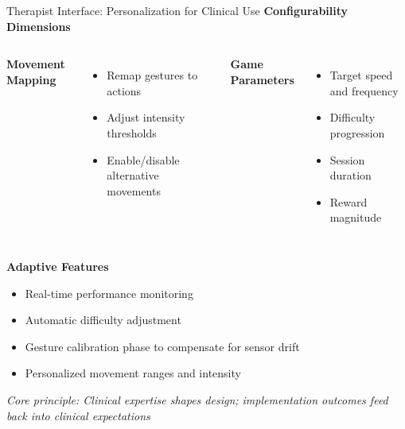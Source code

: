 \begin{frame}{Therapist Interface: Personalization for Clinical Use}
	\textbf{\textcolor{gbAqua}{Configurability Dimensions}}
	
	\begin{columns}[t]
		\textbf{Movement Mapping}
		
		\begin{itemize}
			\item Remap gestures to actions
			\item Adjust intensity thresholds
			\item Enable/disable alternative movements
		\end{itemize}
		
		\textbf{Game Parameters}
		
		\begin{itemize}
			\item Target speed and frequency
			\item Difficulty progression
			\item Session duration
			\item Reward magnitude
		\end{itemize}
	\end{columns}
	
	\vspace{0.3cm}
	
	\textbf{\textcolor{gbAqua}{Adaptive Features}}
	
	\begin{itemize}
		\item Real-time performance monitoring
		\item Automatic difficulty adjustment
		\item Gesture calibration phase to compensate for sensor drift
		\item Personalized movement ranges and intensity
	\end{itemize}
	
	\vspace{0.2cm}
	
	\textit{Core principle: Clinical expertise shapes design; implementation outcomes feed back into clinical expectations}
\end{frame}

